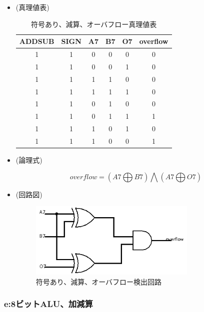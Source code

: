 \documentclass[11pt,a4j]{jsarticle}
\begin{document}
    \begin{itemize}
    
    \item (真理値表)
    
     \begin{table}[htb]
  \begin{center}
    \caption{符号あり、減算、オーバフロー真理値表}
    \begin{tabular}{ccccc|c} \toprule
ADDSUB & SIGN & A7 & B7 & O7 & overflow \\ \midrule
1 & 1 & 0 & 0 & 0 & 0 \\
1 & 1 & 0 & 0 & 1 & 0 \\
1 & 1 & 1 & 1 & 0 & 0 \\
1 & 1 & 1 & 1 & 1 & 0 \\
1 & 1 & 0 & 1 & 0 & 0 \\
1 & 1 & 0 & 1 & 1 & 1 \\
1 & 1 & 1 & 0 & 1 & 0 \\
1 & 1 & 1 & 0 & 0 & 1 \\ \bottomrule
    \end{tabular}
    \label{}
  \end{center}
 \end{table}
    
    \item (論理式)
    
    \begin{equation}
    overflow = (A7 \bigoplus B7) \bigwedge (A7 \bigoplus O7)
    \end{equation}
    
    \item (回路図)
    
    \begin{figure}[htbp]
  \centering
  \includegraphics[width=8cm,clip]{3-d.png}
  \caption{符号あり、減算、オーバフロー検出回路}
  \label{fig:3-d}
 \end{figure}
    
    \end{itemize}
    
    \clearpage
    
    \subsubsection{e:8ビットALU、加減算}
    
\end{document}
